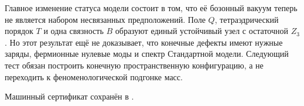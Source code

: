 Главное изменение статуса модели состоит в том, что её бозонный вакуум
теперь не является набором несвязанных предположений. Поле $Q$,
тетраэдрический порядок $T$ и одна связность $B$ образуют единый
устойчивый узел с остаточной $Z_3$. Но этот результат ещё не доказывает,
что конечные дефекты имеют нужные заряды, фермионные нулевые моды и
спектр Стандартной модели. Следующий тест обязан построить конечную
пространственную конфигурацию, а не переходить к феноменологической
подгонке масс.

Машинный сертификат сохранён в
.